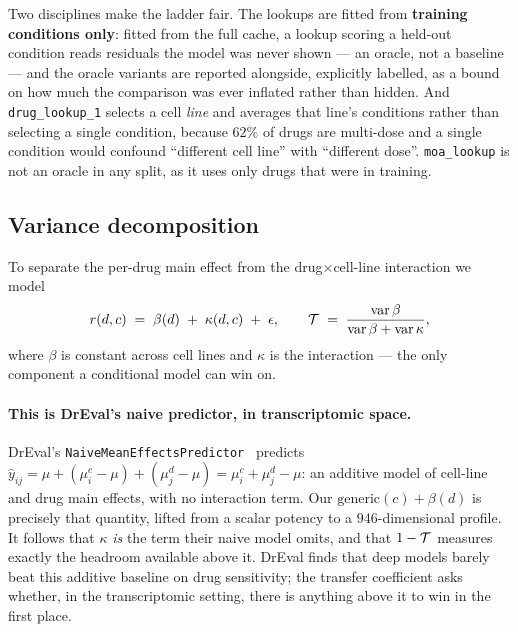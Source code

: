 Two disciplines make the ladder fair. The lookups are fitted from \textbf{training conditions
only}: fitted from the full cache, a lookup scoring a held-out condition reads residuals the model
was never shown --- an oracle, not a baseline --- and the oracle variants are reported alongside,
explicitly labelled, as a bound on how much the comparison was ever inflated rather than hidden.
And \texttt{drug\_lookup\_1} selects a cell \emph{line} and averages that line's conditions rather
than selecting a single condition, because $62\%$ of drugs are multi-dose and a single condition
would confound ``different cell line'' with ``different dose''. \texttt{moa\_lookup} is not an
oracle in any split, as it uses only drugs that were in training.

\subsection{Variance decomposition}
\label{sec:methods-vardecomp}

To separate the per-drug main effect from the drug$\times$cell-line interaction we model
\begin{equation}
  r(d,c) \;=\; \beta(d) \;+\; \kappa(d,c) \;+\; \epsilon,
  \qquad
  \mathcal{T} \;=\; \frac{\operatorname{var}\beta}{\operatorname{var}\beta + \operatorname{var}\kappa},
\end{equation}
where $\beta$ is constant across cell lines and $\kappa$ is the interaction --- the only component a
conditional model can win on.

\paragraph{This is DrEval's naive predictor, in transcriptomic space.} DrEval's
\texttt{NaiveMeanEffectsPredictor}~\cite{dreval} predicts
$\hat{y}_{ij} = \mu + (\mu^c_i - \mu) + (\mu^d_j - \mu) = \mu^c_i + \mu^d_j - \mu$: an additive
model of cell-line and drug main effects, with no interaction term. Our
$\textrm{generic}(c) + \beta(d)$ is precisely that quantity, lifted from a scalar potency to a
$946$-dimensional profile. It follows that $\kappa$ \emph{is} the term their naive model omits, and
that $1 - \mathcal{T}$ measures exactly the headroom available above it. DrEval finds that deep models
barely beat this additive baseline on drug sensitivity; the transfer coefficient asks whether, in
the transcriptomic setting, there is anything above it to win in the first place.

